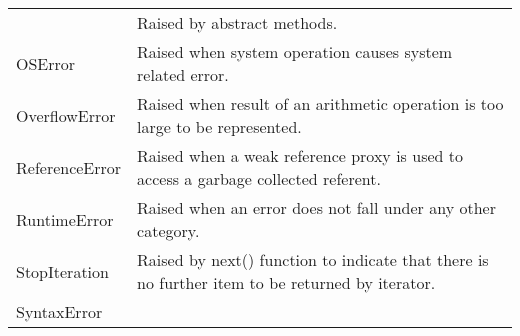 \documentclass[11pt]{article}
\begin{document}
\begin{longtable}[]{@{}ll@{}}
\begin{minipage}[t]{0.15\columnwidth}
\end{minipage} & \begin{minipage}[t]{0.79\columnwidth}\raggedright\strut
Raised by abstract methods.\strut
\end{minipage}\tabularnewline
\begin{minipage}[t]{0.15\columnwidth}\raggedright\strut
OSError\strut
\end{minipage} & \begin{minipage}[t]{0.79\columnwidth}\raggedright\strut
Raised when system operation causes system related error.\strut
\end{minipage}\tabularnewline
\begin{minipage}[t]{0.15\columnwidth}\raggedright\strut
OverflowError\strut
\end{minipage} & \begin{minipage}[t]{0.79\columnwidth}\raggedright\strut
Raised when result of an arithmetic operation is too large to be
represented.\strut
\end{minipage}\tabularnewline
\begin{minipage}[t]{0.15\columnwidth}\raggedright\strut
ReferenceError\strut
\end{minipage} & \begin{minipage}[t]{0.79\columnwidth}\raggedright\strut
Raised when a weak reference proxy is used to access a garbage collected
referent.\strut
\end{minipage}\tabularnewline
\begin{minipage}[t]{0.15\columnwidth}\raggedright\strut
RuntimeError\strut
\end{minipage} & \begin{minipage}[t]{0.79\columnwidth}\raggedright\strut
Raised when an error does not fall under any other category.\strut
\end{minipage}\tabularnewline
\begin{minipage}[t]{0.15\columnwidth}\raggedright\strut
StopIteration\strut
\end{minipage} & \begin{minipage}[t]{0.79\columnwidth}\raggedright\strut
Raised by next() function to indicate that there is no further item to
be returned by iterator.\strut
\end{minipage}\tabularnewline
\begin{minipage}[t]{0.15\columnwidth}\raggedright\strut
SyntaxError\strut
\end{minipage} & \begin{minipage}[t]{0.79\columnwidth}\raggedright\strut

\end{minipage}
\end{longtable}
\end{document}
